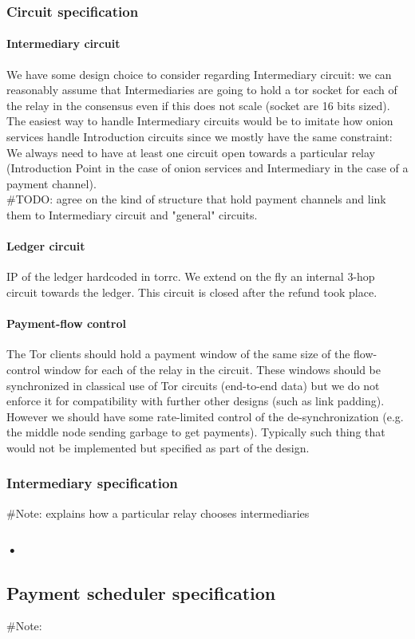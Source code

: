 \documentclass{article}
\begin{document}
 \subsubsection{Circuit specification}
 
 	\paragraph*{Intermediary circuit}
	
	We have some design choice to consider regarding Intermediary circuit: we can reasonably assume that Intermediaries are going to hold a tor socket for each of the relay in the consensus even if this does not scale (socket are 16 bits sized). The easiest way to handle Intermediary circuits would be to imitate how onion services handle Introduction circuits since we mostly have the same constraint: We always need to have at least one circuit open towards a particular relay (Introduction Point in the case of onion services and Intermediary in the case of a payment channel).\\
	\#TODO: agree on the kind of structure that hold payment channels and link them to Intermediary circuit and "general" circuits.
 	
 	\paragraph*{Ledger circuit}
 	
 	IP of the ledger hardcoded in torrc. We extend on the fly an internal 3-hop circuit towards the ledger. This circuit is closed after the refund took place.
 	
 	\paragraph*{Payment-flow control}
 	
 	The Tor clients should hold a payment window of the same size of the flow-control window for each of the relay in the circuit. These windows should be synchronized in classical use of Tor circuits (end-to-end data) but we do not enforce it for compatibility with further other designs (such as link padding). However we should have some rate-limited control of the de-synchronization (e.g. the middle node sending garbage to get payments). Typically such thing that would not be implemented but specified as part of the design.
 	
 \subsubsection{Intermediary specification}
 	\#Note: explains how a particular relay chooses intermediaries
 	
 \subsubsection{•}
\subsection{Payment scheduler specification}
	\#Note: 
\end{document}
